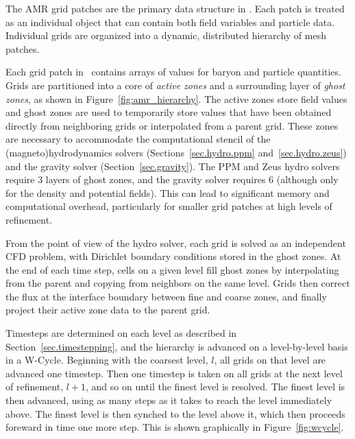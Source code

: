 The AMR grid patches are the primary data structure in \enzo.  Each patch is treated as an individual object that can contain both field variables and particle data.  Individual grids are organized into a  dynamic, distributed hierarchy of mesh patches.  

Each grid patch in \enzo\ contains arrays of values for baryon and particle quantities.   Grids are partitioned into a core of \emph{active zones} and a surrounding layer of \emph{ghost zones}, as shown in Figure~\ref{fig:amr_hierarchy}.    The active zones store field values and ghost zones are used to temporarily store values that have been obtained directly from neighboring grids or interpolated from a parent grid.  These zones are necessary to accommodate the computational stencil of the (magneto)hydrodynamics solvers (Sections~\ref{sec.hydro.ppm} and~\ref{sec.hydro.zeus}) and the gravity solver (Section~\ref{sec.gravity}).  The PPM and Zeus hydro solvers require 3 layers of ghost zones,  and the gravity solver requires 6 (although only for the density and potential fields).  This can lead to significant memory and computational overhead, particularly for smaller grid patches at high levels of refinement.  

From the point of view of the hydro solver, each grid is solved as an independent CFD problem, with Dirichlet boundary conditions stored in the ghost zones.  At the end of each time step, cells on a given level fill ghost zones by interpolating from the parent and copying from neighbors on the same level.  Grids then correct the flux at the interface boundary between fine and coarse zones, and finally project their active zone data to the parent grid. 

Timesteps are determined on each level as described in Section~\ref{sec.timestepping}, and the hierarchy is advanced on
a level-by-level basis in a W-Cycle.    Beginning with the coarsest level, $l$, all grids on that level are advanced one
timestep.  Then one timestep is taken on all grids at the next level of refinement, $l+1$, and so on until the finest level is resolved. The finest level is then advanced, using as many steps as it takes to reach the level immediately above.  The finest level is then synched to the level above it, which then proceeds foreward in time one more step.  This is shown graphically in Figure~\ref{fig:wcycle}.

